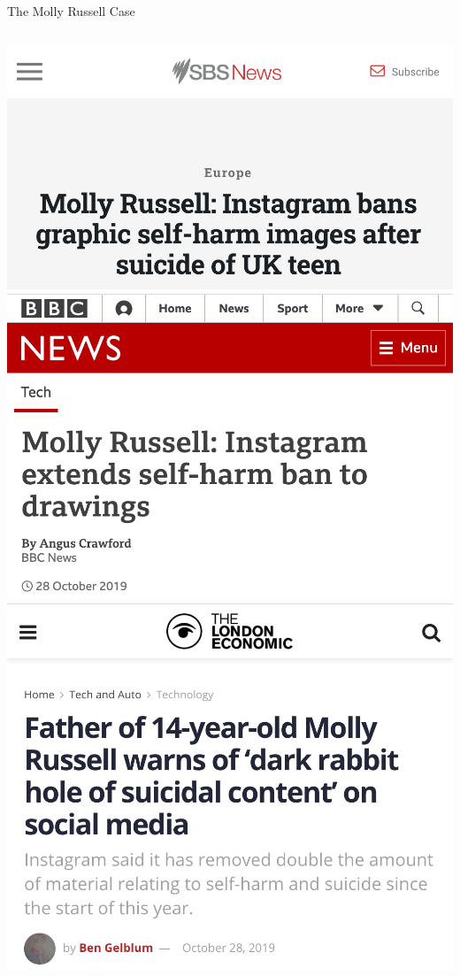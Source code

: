 \documentclass[nobackground,dvipsnames,table]{beamer}
\begin{document}
\begin{frame}{The Molly Russell Case}
    \begin{columns}
            \includegraphics[width=\textwidth]{molly-russell-article-1}
            \includegraphics[width=\textwidth]{molly-russell-article-2}
            \includegraphics[width=\textwidth]{molly-russell-article-3}

\end{columns}
\end{frame}
\end{document}
